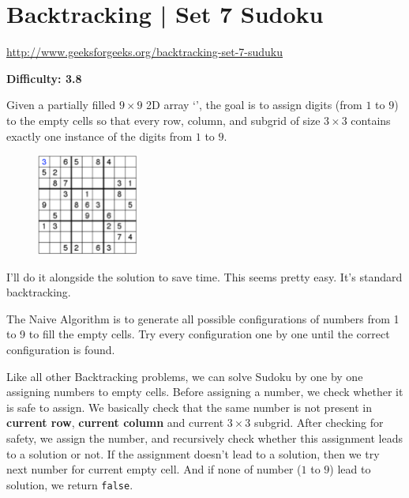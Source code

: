 \section{Backtracking | Set 7 Sudoku
  \label{secGFGBktrckSet7Sudoku}}

\url{http://www.geeksforgeeks.org/backtracking-set-7-suduku}

\textbf{Difficulty: 3.8}

Given a partially filled $9\times 9$ 2D array `', the goal
is to assign digits (from $1$ to $9$) to the empty cells so that every row,
column, and subgrid of size $3\times 3$ contains exactly one instance of the
digits from $1$ to $9$.

\begin{figure}
\centering
\includegraphics[width=0.3\textwidth]{Images/figGFGBkTSet7Sudoku}
\end{figure}

\textbf{}

\RayNotesBegin

I'll do it alongside the solution to save time. This seems pretty easy. It's
standard backtracking.

\RayNotesEnd

\textbf{}


The Naive Algorithm is to generate all possible configurations of numbers
from 1 to 9 to fill the empty cells. Try every configuration one by one
until the correct configuration is found.


Like all other Backtracking problems, we can solve Sudoku by one by one
assigning numbers to empty cells. Before assigning a number, we check
whether it is safe to assign. We basically check that the same number is not
present in \textbf{current row}, \textbf{current column} and current
$3\times 3$ subgrid. After checking for safety, we assign the number, and
recursively check whether this assignment leads to a solution or not. If the
assignment doesn't lead to a solution, then we try next number for current
empty cell. And if none of number ($1$ to $9$) lead to solution, we return
\texttt{false}.

